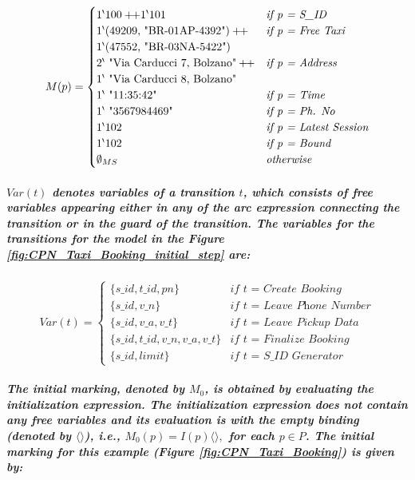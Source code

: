 \begin{equation*}
M(p) = \begin{cases}
{1}^{\backprime}100 +\!\!+ {1}^{\backprime}101 & \textit{if p = S\_ID}\\
\textnormal{${1}^{\backprime}$(49209,\bdsq{BR-01AP-4392})} +\!\!+  & \textit{if p = Free Taxi}\\
\textnormal{${1}^{\backprime}$(47552,\bdsq{BR-03NA-5422})} & \\
\textnormal{${2}^{\backprime}$\bdsq{Via Carducci 7, Bolzano}} +\!\!+ & \textit{if p = Address}\\ 
\textnormal{${1}^{\backprime}$\bdsq{Via Carducci 8, Bolzano}} & \\
\textnormal{${1}^{\backprime}$\bdsq{11:35:42}} & \textit{if p = Time}\\
\textnormal{${1}^{\backprime}$\bdsq{3567984469}} & \textit{if p = Ph. No}\\
\textnormal{${1}^{\backprime}$102} & \textit{if p = Latest Session}\\
\textnormal{${1}^{\backprime}$102} & \textit{if p = Bound}\\
\emptyset_{MS} & \textit{otherwise}
\end{cases}
\end{equation*}

\subparagraph*{\textnormal{$\mathit{Var(t)}$ denotes \textbf{\textit{variables of a transition}} $\mathit{t}$, which consists of free variables appearing either in any of the arc expression connecting the transition or in the guard of the transition. The variables for the transitions for the model in the Figure \ref{fig:CPN_Taxi_Booking_initial_step} are:}}
\begin{equation*}
Var(t) = \begin{cases}
\{s\_id,t\_id,pn\} & \textit{if t = Create Booking}\\
\{s\_id,v\_n\} & \textit{if t = Leave Phone Number}\\
\{s\_id,v\_a,v\_t\} & \textit{if t = Leave Pickup Data}\\
\{s\_id,t\_id,v\_n,v\_a,v\_t\} & \textit{if t = Finalize Booking}\\
\{s\_id,limit\} & \textit{if t = S\_ID Generator} 
\end{cases}
\end{equation*}

\subparagraph*{\textnormal{The \textbf{\textit{initial marking}}, denoted by $\mathit{M_{0}}$, is obtained by evaluating the initialization expression. The initialization expression does not contain any free variables and its evaluation is with the empty binding (denoted by $\mathit{\langle \rangle}$), i.e., $\mathit{M_{0}(p) = I(p)\langle \rangle,}$ for each $\mathit{p \in P}$. The initial marking for this example (Figure \ref{fig:CPN_Taxi_Booking}) is given by:}}

